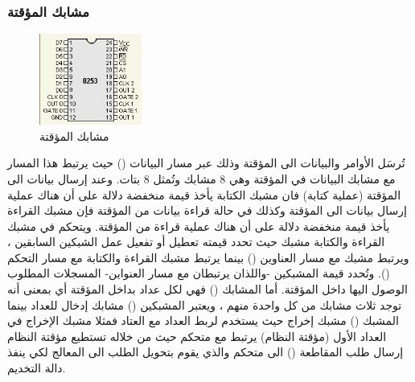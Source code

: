 \documentclass[document.tex]{subfiles}
\begin{document}
\subsubsection{مشابك المؤقتة }
\begin{figure}
  \vspace{-20pt}
  \begin{center}
    \includegraphics[width=0.30\textwidth]{../img/pit_pins}
  \end{center}
  \vspace{-20pt}
  \caption{مشابك المؤقتة }
  \vspace{-10pt}
\label{fig:pit_pins} 
\end{figure}
تُرسَل الأوامر والبيانات الى المؤقتة وذلك عبر مسار البيانات () حيث يرتبط هذا المسار مع مشابك البيانات في المؤقتة وهي 8 مشابك  وتُمثل 8 بتات. وعند إرسال بيانات الى المؤقتة (عملية كتابة) فان مشبك الكتابة  يأخذ قيمة منخفضة دلالة على أن هناك عملية إرسال بيانات الى المؤقتة وكذلك في حالة قراءة بيانات من المؤقتة فإن مشبك القراءة  يأخذ قيمة منخفضة دلالة على أن هناك عملية قراءة من المؤقتة. ويتحكم في مشبك القراءة والكتابة مشبك  حيث تحدد قيمته تعطيل أو تفعيل عمل الشبكين السابقين ، ويرتبط مشبك  مع مسار العناوين () بينما يرتبط مشبك القراءة والكتابة مع مسار التحكم (). وتُحدد قيمة المشبكين  -واللذان يرتبطان مع مسار العنواين- المسجلات المطلوب الوصول اليها داخل المؤقتة. أما المشابك () فهي لكل عداد بداخل المؤقتة أي بمعنى أنه توجد ثلاث مشابك من كل واحدة منهم ، ويعتبر المشبكين () مشابك إدخال للعداد بينما المشبك () مشبك إخراج حيث يستخدم لربط العداد مع العتاد فمثلا مشبك الإخراج في العداد الأول (مؤقتة النظام) يرتبط مع متحكم  حيث من خلاله تستطيع مؤقتة النظام إرسال طلب المقاطعة () الى متحكم  والذي يقوم بتحويل الطلب الى المعالج لكي ينفذ دالة التخديم.
\end{document}
